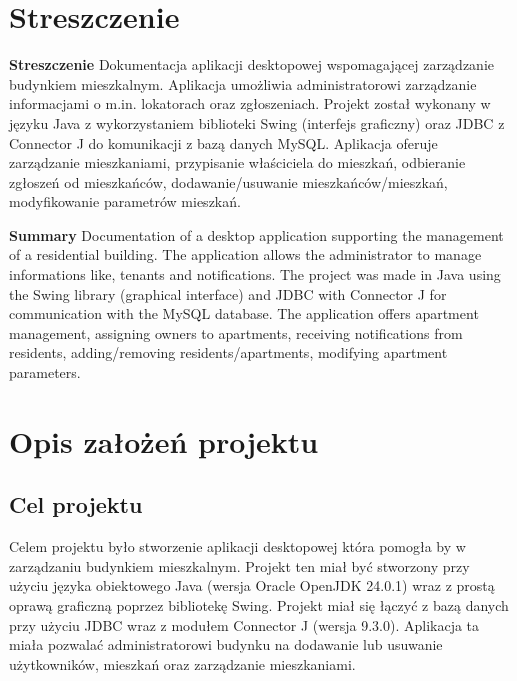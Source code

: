 \chapter{Streszczenie}
\label{cha:elementyPracyproj}

\textbf{Streszczenie}
\newline 
\indent Dokumentacja aplikacji desktopowej wspomagającej zarządzanie budynkiem mieszkalnym. 
Aplikacja umożliwia administratorowi zarządzanie informacjami o m.in. lokatorach oraz zgłoszeniach. 
Projekt został wykonany w języku Java z wykorzystaniem biblioteki Swing (interfejs graficzny) oraz JDBC z Connector J do komunikacji z bazą danych MySQL. 
Aplikacja oferuje zarządzanie mieszkaniami, przypisanie właściciela do mieszkań, odbieranie zgłoszeń od mieszkańców,
dodawanie/usuwanie mieszkańców/mieszkań, modyfikowanie parametrów mieszkań.\newline 

\textbf{Summary}
\newline 
\indent Documentation of a desktop application supporting the management of a residential building. 
The application allows the administrator to manage informations like, tenants and notifications. 
The project was made in Java using the Swing library (graphical interface) and JDBC with Connector J for communication with the MySQL database. 
The application offers apartment management, assigning owners to apartments, receiving notifications from residents, 
adding/removing residents/apartments, modifying apartment parameters.

\newpage
\chapter{Opis założeń projektu}
\section{Cel projektu}
Celem projektu było stworzenie aplikacji desktopowej która pomogła by w zarządzaniu budynkiem mieszkalnym. Projekt ten miał być 
stworzony przy użyciu języka obiektowego Java (wersja Oracle OpenJDK 24.0.1) wraz z prostą oprawą graficzną poprzez bibliotekę Swing.
Projekt miał się łączyć z bazą danych przy użyciu JDBC wraz z modułem Connector J (wersja 9.3.0). Aplikacja ta miała pozwalać 
administratorowi budynku na dodawanie lub usuwanie użytkowników, mieszkań oraz zarządzanie mieszkaniami.

